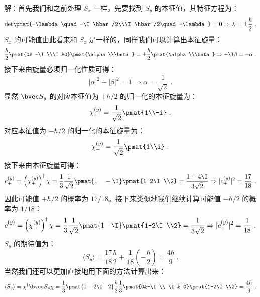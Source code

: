 \begin{example}{}
解：首先我们和之前处理 $S_x$ 一样，先要找到 $S_y$ 的本征值，其特征方程为：
\begin{equation}
\rm{det}\pmat{-\lambda \quad -\I\hbar/2\\\I\hbar/2\quad -\lambda}=0\Rightarrow\lambda=\pm\frac{\hbar}{2}~.
\end{equation}
$S_x$ 的可能值由此看来和 $S_z$ 是一样的，同样我们可以计算出本征旋量：
\begin{equation}
\frac{\hbar}{2}\pmat{0& -\I\\\I&0}\pmat{\alpha\\\beta}=\pm\frac{\hbar}{2}\pmat{\alpha\\\beta} \Rightarrow -\I\beta=\pm\alpha~.
\end{equation}
接下来由旋量必须归一化性质可得：
\begin{equation}
|\alpha|^2+|\beta|^2=1\Rightarrow\alpha=\frac{1}{\sqrt{2}}~.
\end{equation}
显然 $\bvec S_y$ 的对应本征值为 $+\hbar/2$ 的归一化的本征旋量为：
\begin{equation}
\chi_+^{(y)}=\frac{1}{\sqrt{2}}\pmat{1\\-i}~.
\end{equation}
对应本征值为 $-\hbar/2$ 的归一化的本征旋量为：
\begin{equation}
\chi_-^{(y)}=\frac{1}{\sqrt{2}}\pmat{1\\i}~.
\end{equation}
接下来由本征旋量可得：
\begin{equation}
c_+^{(y)}=\left(\chi_+^{(y)}\right)^\dagger\chi=\frac{1}{3}\frac{1}{\sqrt{2}}\pmat{1\quad -\I}\pmat{1-2\I\\2}=\frac{1-4\I}{3\sqrt{2}}\Rightarrow |c_+^{(y)}|^2=\frac{17}{18}~,
\end{equation}
因此可能值 $+\hbar/2$ 的概率为 $17/18$。接下来类似地我们继续计算可能值 $-\hbar/2$ 的概率为 $1/18$：
\begin{equation}
c_-^{(y)}=\left(\chi_-^{(y)}\right)^\dagger\chi=\frac{1}{3}\frac{1}{\sqrt{2}}\pmat{1\quad \I}\pmat{1-2\I\\2}=\frac{1}{3\sqrt{2}}\Rightarrow |c_+^{(y)}|^2=\frac{1}{18}~.
\end{equation}
$S_y$ 的期待值为：
\begin{equation}
\langle S_y \rangle =\frac{17}{18}\frac{\hbar}{2}+\frac{1}{18}\left(-\frac{\hbar}{2}\right)=\frac{4\hbar}{9}~.
\end{equation}
当然我们还可以更加直接地用下面的方法计算出来：
\begin{equation}
\langle S_y \rangle = \chi^\dagger\bvec S_y\chi = \frac{1}{3}\pmat{1-2\I\quad 2}\frac{\hbar}{2}\frac{1}{3}\pmat{0&-\I\\ \I& 0}\pmat{1-2\I\\2}=\frac{4\hbar}{9}~.
\end{equation}

\end{example}

